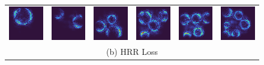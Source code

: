 \documentclass[letterpaper]{article} %
\begin{document}
\begin{figure}[!htbp]
\begin{tabular}{cccccc}
\multicolumn{1}{c}{\includegraphics[width=0.125\linewidth]{saliency/hrr/circle/swap_1.png}} \hspace{-12pt} &  \multicolumn{1}{c}{\includegraphics[width=0.125\linewidth]{saliency/hrr/circle/swap_2.png}} \hspace{-12pt} & \multicolumn{1}{c}{\includegraphics[width=0.125\linewidth]{saliency/hrr/circle/swap_3.png}} \hspace{-12pt} & \multicolumn{1}{c}{\includegraphics[width=0.125\linewidth]{saliency/hrr/circle/swap_4.png}} \hspace{-12pt} & \multicolumn{1}{c}{\includegraphics[width=0.125\linewidth]{saliency/hrr/circle/swap_5.png}} \hspace{-12pt} & \multicolumn{1}{c}{\includegraphics[width=0.125\linewidth]{saliency/hrr/circle/swap_6.png}} \\
\multicolumn{6}{c}{(b) HRR Loss} \\


\end{tabular}
\end{figure}
\end{document}
